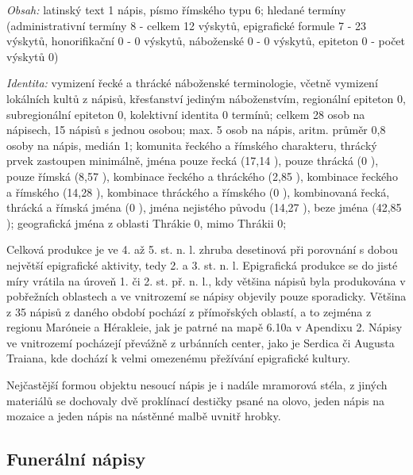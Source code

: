 {\em Obsah:} latinský text 1 nápis, písmo římského typu 6; hledané termíny (administrativní termíny 8 - celkem 12 výskytů, epigrafické formule 7 - 23 výskytů, honorifikační 0 - 0 výskytů, náboženské 0 - 0 výskytů, epiteton 0 - počet výskytů 0)

{\em Identita:} vymizení řecké a thrácké náboženské terminologie, včetně vymizení lokálních kultů z nápisů, křesťanství jediným náboženstvím, regionální epiteton 0, subregionální epiteton 0, kolektivní identita 0 termínů; celkem 28 osob na nápisech, 15 nápisů s jednou osobou; max. 5 osob na nápis, aritm. průměr 0,8 osoby na nápis, medián 1; komunita řeckého a římského charakteru, thrácký prvek zastoupen minimálně, jména pouze řecká (17,14 ), pouze thrácká (0 ), pouze římská (8,57 ), kombinace řeckého a thráckého (2,85 ), kombinace řeckého a římského (14,28 ), kombinace thráckého a římského (0 ), kombinovaná řecká, thrácká a římská jména (0 ), jména nejistého původu (14,27 ), beze jména (42,85 ); geografická jména z oblasti Thrákie 0, mimo Thrákii 0;

\NC\AR
\HL
\HL
\stoptable

Celková produkce je ve 4. až 5. st. n. l. zhruba desetinová při porovnání s dobou největší epigrafické aktivity, tedy 2. a 3. st. n. l. Epigrafická produkce se do jisté míry vrátila na úroveň 1. či 2. st. př. n. l., kdy většina nápisů byla produkována v pobřežních oblastech a ve vnitrozemí se nápisy objevily pouze sporadicky. Většina z 35 nápisů z daného období pochází z přímořských oblastí, a to zejména z regionu Maróneie a Hérakleie, jak je patrné na mapě 6.10a v Apendixu 2. Nápisy ve vnitrozemí pocházejí převážně z urbánních center, jako je Serdica či Augusta Traiana, kde dochází k velmi omezenému přežívání epigrafické kultury.

Nejčastější formou objektu nesoucí nápis je i nadále mramorová stéla, z jiných materiálů se dochovaly dvě proklínací destičky psané na olovo, jeden nápis na mozaice a jeden nápis na nástěnné malbě uvnitř hrobky.

\subsection[funerální-nápisy-18]{Funerální nápisy}

